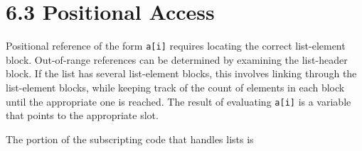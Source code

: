\section[6.3 Positional Access]{6.3 Positional Access}

Positional reference of the form \texttt{a[i]} requires locating the
correct list-element block. Out-of-range references can be determined
by examining the list-header block. If the list has several
list-element blocks, this involves linking through the list-element
blocks, while keeping track of the count of elements in each block
until the appropriate one is reached. The result of evaluating
\texttt{a[i]} is a variable that points to the appropriate slot.

The portion of the subscripting code that handles lists is

